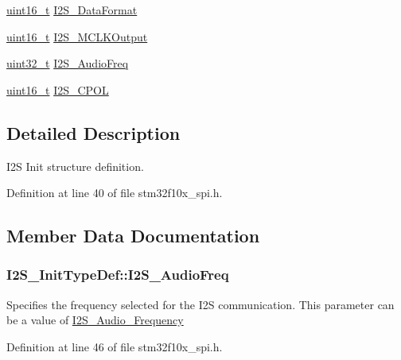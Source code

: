 \begin{DoxyCompactItemize}
\item 
\hyperlink{_p_e___types_8h_a1f1825b69244eb3ad2c7165ddc99c956}{uint16\+\_\+t} \hyperlink{struct_i2_s___init_type_def_ad5e59034081427fd638983c10f18e833}{I2\+S\+\_\+\+Data\+Format}
\item 
\hyperlink{_p_e___types_8h_a1f1825b69244eb3ad2c7165ddc99c956}{uint16\+\_\+t} \hyperlink{struct_i2_s___init_type_def_ae7aaf79b7f392d79ac2f7b35a24e5d1a}{I2\+S\+\_\+\+M\+C\+L\+K\+Output}
\item 
\hyperlink{_p_e___types_8h_a33594304e786b158f3fb30289278f5af}{uint32\+\_\+t} \hyperlink{struct_i2_s___init_type_def_a87674c5fbccad53b7646565f35d1fc0a}{I2\+S\+\_\+\+Audio\+Freq}
\item 
\hyperlink{_p_e___types_8h_a1f1825b69244eb3ad2c7165ddc99c956}{uint16\+\_\+t} \hyperlink{struct_i2_s___init_type_def_aeb7741728520734ec2eab95d2143778c}{I2\+S\+\_\+\+C\+P\+OL}
\end{DoxyCompactItemize}


\subsection{Detailed Description}
I2S Init structure definition. 

Definition at line 40 of file stm32f10x\+\_\+spi.\+h.



\subsection{Member Data Documentation}
\subsubsection[{\texorpdfstring{I2\+S\+\_\+\+Audio\+Freq}{I2S_AudioFreq}}]{ I2\+S\+\_\+\+Init\+Type\+Def\+::\+I2\+S\+\_\+\+Audio\+Freq}\hypertarget{struct_i2_s___init_type_def_aa73d0e4685a8ead6dcd14cba79bcb6ee}{}\label{struct_i2_s___init_type_def_aa73d0e4685a8ead6dcd14cba79bcb6ee}
Specifies the frequency selected for the I2S communication. This parameter can be a value of \hyperlink{group___i2_s___audio___frequency}{I2\+S\+\_\+\+Audio\+\_\+\+Frequency} 

Definition at line 46 of file stm32f10x\+\_\+spi.\+h.

